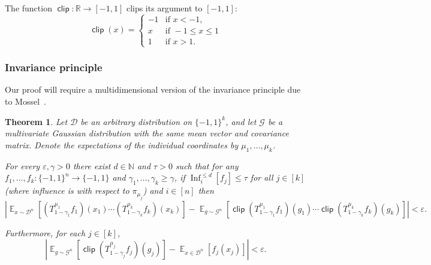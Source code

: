 \documentclass{article}
\newtheorem{theorem}{Theorem}[section]
\theoremstyle{definition}
\theoremstyle{remark}
\DeclareMathOperator*{\E}{\mathbb{E}}
\DeclareMathOperator{\Inf}{Inf}
\DeclareMathOperator{\clip}{\mathsf{clip}}
\newcommand\eps{\varepsilon}
\renewcommand\epsilon{\eps}
\renewcommand\geq{\geqslant}
\renewcommand\leq{\leqslant}
\begin{document}
The function $\clip\colon \mathbb{R} \to [-1,1]$ clips its argument to $[-1,1]$:
\[
 \clip(x) = \begin{cases} -1 & \text{if } x < -1, \\ x & \text{if } -1 \leq x \leq 1 \\ 1 & \text{if } x > 1. \end{cases}
\]

\subsubsection{Invariance principle}

Our proof will require a multidimensional version of the invariance principle due to Mossel~\cite{Mossel2010}.

\begin{theorem} \label{thm:invariance}
Let $\mathcal{D}$ be an arbitrary distribution on $\{-1,1\}^k$, and let $\mathcal{G}$ be a multivariate Gaussian distribution with the same mean vector and covariance matrix. Denote the expectations of the individual coordinates by $\mu_1,\ldots,\mu_k$.

For every $\epsilon,\gamma > 0$ there exist $d \in \mathbb{N}$ and $\tau > 0$ such that for any $f_1,\ldots,f_k\colon \{-1,1\}^n \to \{-1,1\}$ and $\gamma_1,\ldots,\gamma_k \geq \gamma$, if $\Inf_i^{\leq d}[f_j] \leq \tau$ for all $j \in [k]$ (where influence is with respect to $\pi_{\mu_j}$) and $i \in [n]$ then
\[
 \left|
 \E_{x \sim \mathcal{D}^n}
 [(T_{1-\gamma_1}^{\mu_1} f_1)(x_1) \cdots (T_{1-\gamma_k}^{\mu_k} f_k)(x_k)]
 -
 \E_{g \sim \mathcal{G}^n}
 [\clip(T_{1-\gamma_1}^{\mu_1} f_1)(g_1) \cdots \clip(T_{1-\gamma_k}^{\mu_k} f_k)(g_k)]
 \right| < \epsilon.
\]

Furthermore, for each $j \in [k]$,
\[
 |\E_{g \sim \mathcal{G}^n}[\clip(T_{1-\gamma_j}^{\mu_j} f_j)(g_j)] - \E_{x \in \mathcal{D}^n}[f_j(x_j)]| < \epsilon.
\]
\end{theorem}
\end{document}
